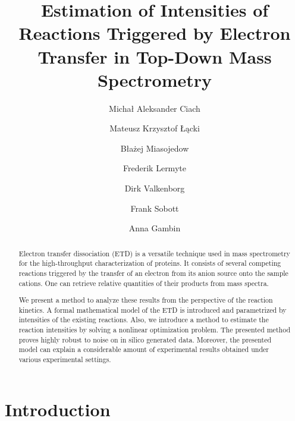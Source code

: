\documentclass{llncs}
\begin{document}
\pagestyle{plain}
\title{Estimation of Intensities of Reactions Triggered by Electron Transfer in Top-Down Mass Spectrometry}
\author{Michał Aleksander Ciach \and Mateusz Krzysztof Łącki \and Błażej Miasojedow \and Frederik Lermyte \and Dirk Valkenborg \and Frank Sobott \and Anna Gambin }






\maketitle
\begin{abstract}
Electron transfer dissociation (ETD) is a versatile technique used in mass spectrometry for the high-throughput characterization of proteins. It consists of several competing reactions triggered by the transfer of an electron from its anion source onto the sample cations. One can retrieve relative quantities of their products from mass spectra.

We present a method to analyze these results from the perspective of the reaction kinetics. A formal mathematical model of the ETD is introduced and parametrized by intensities of the existing reactions. Also, we introduce a method to estimate the reaction intensities by solving a nonlinear optimization problem. The presented method proves highly robust to noise on in silico generated data. Moreover, the presented model can explain a considerable amount of experimental results obtained under various experimental settings.
\end{abstract}

\section{Introduction}
\end{document}
